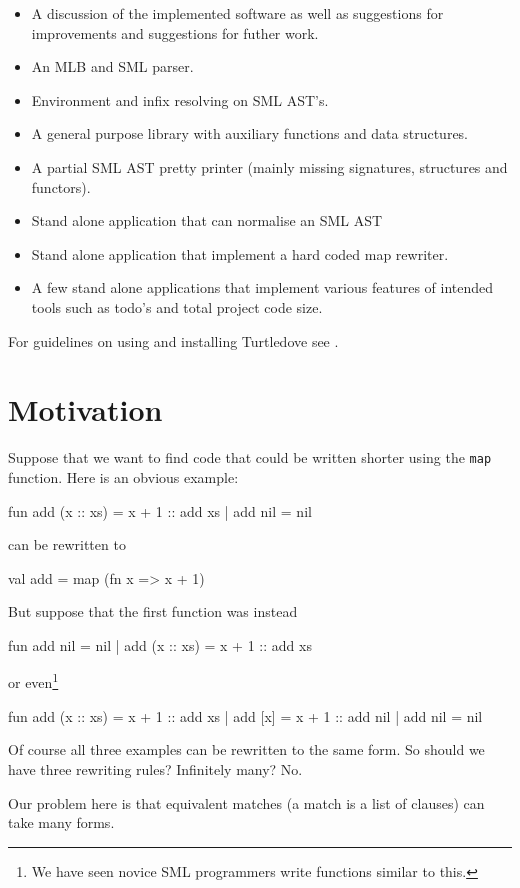 \begin{itemize}

\item A discussion of the implemented software as well as suggestions for
improvements and suggestions for futher work.
\item An MLB and SML parser.
\item Environment and infix resolving on SML AST's.
\item A general purpose library with auxiliary functions and data structures.
\item A partial SML AST pretty printer (mainly missing signatures, structures
  and functors).
\item Stand alone application that can normalise an SML AST
\item Stand alone application that implement a hard coded map rewriter.
\item A few stand alone applications that implement various features of intended
  tools such as todo's and total project code size.
\end{itemize}

For guidelines on using and installing Turtledove see .

\section{Motivation}
\label{sec:motivation}
Suppose that we want to find code that could be written shorter using the
\texttt{map} function.
Here is an obvious example:
\begin{sml}
fun add (x :: xs) = x + 1 :: add xs
  | add nil       = nil
\end{sml}
can be rewritten to
\begin{sml}
val add = map (fn x => x + 1)
\end{sml}
But suppose that the first function was instead
\begin{sml}
fun add nil       = nil
  | add (x :: xs) = x + 1 :: add xs
\end{sml}
or even\footnote{We have seen novice SML programmers write functions similar to
  this.}
\begin{sml}
fun add (x :: xs) = x + 1 :: add xs
  | add [x]       = x + 1 :: add nil
  | add nil       = nil
\end{sml}
Of course all three examples can be rewritten to the same form. So should we
have three rewriting rules? Infinitely many? No.

Our problem here is that equivalent matches (a match is a list of clauses) can
take many forms.

